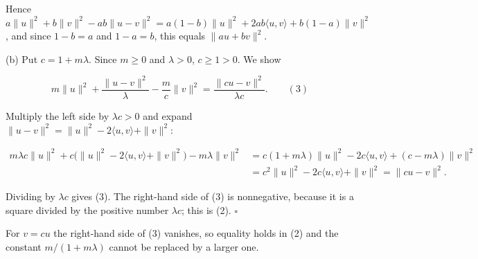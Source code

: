\documentclass[11pt,a4paper]{article}
\begin{document}
Hence \(a\|u\|^2+b\|v\|^2-ab\|u-v\|^2=a(1-b)\|u\|^2+2ab\langle u,v\rangle+b(1-a)\|v\|^2\), and since \(1-b=a\) and \(1-a=b\), this equals \(\|au+bv\|^2\).




(b) Put \(c=1+m\lambda\). Since \(m\ge0\) and \(\lambda>0\), \(c\ge1>0\). We show


\[m\|u\|^2+\frac{\|u-v\|^2}{\lambda}-\frac{m}{c}\|v\|^2=\frac{\|cu-v\|^2}{\lambda c}.\qquad(3)\]


Multiply the left side by \(\lambda c>0\) and expand \(\|u-v\|^2=\|u\|^2-2\langle u,v\rangle+\|v\|^2\):


\[\begin{aligned}
m\lambda c\|u\|^2+c\bigl(\|u\|^2-2\langle u,v\rangle+\|v\|^2\bigr)-m\lambda\|v\|^2
&=c(1+m\lambda)\|u\|^2-2c\langle u,v\rangle+(c-m\lambda)\|v\|^2\\
&=c^2\|u\|^2-2c\langle u,v\rangle+\|v\|^2=\|cu-v\|^2 .
\end{aligned}\]


Dividing by \(\lambda c\) gives (3). The right-hand side of (3) is nonnegative, because it is a square divided by the positive number \(\lambda c\); this is (2). \(\square\)




For \(v=cu\) the right-hand side of (3) vanishes, so equality holds in (2) and the constant \(m/(1+m\lambda)\) cannot be replaced by a larger one.
\end{document}
